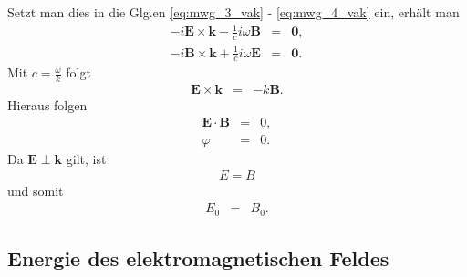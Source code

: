 \documentclass{book}
\begin{document}
%
Setzt man dies in die Glg.en \eqref{eq:mwg_3_vak} - \eqref{eq:mwg_4_vak} ein, erhält man
%
\begin{eqnarray}
- i\mathbf{E}\times\mathbf{k} - \frac{1}{c}i\omega\mathbf{B} & = & \mathbf{0}\label{eq:ed_deriv_1},\\
- i\mathbf{B}\times\mathbf{k} + \frac{1}{c}i\omega\mathbf{E} & = & \mathbf{0}\label{eq:ed_deriv_2}.
\end{eqnarray}
%
Mit $c = \frac{\omega}{k}$ folgt
%
\begin{eqnarray}
\mathbf{E}\times\mathbf{k} & = & -k\mathbf{B}.
\end{eqnarray}
%
Hieraus folgen
%
\begin{eqnarray}
\mathbf{E}\cdot\mathbf{B} & = & 0,\\
\varphi & = & 0.
\end{eqnarray}
%
Da $\mathbf{E}\perp\mathbf{k}$ gilt, ist
%
\begin{eqnarray}
E = B
\end{eqnarray}
%
und somit
%
\begin{eqnarray}
E_0 & = & B_0.
\end{eqnarray}
%
\subsection{Energie des elektromagnetischen Feldes}
\label{sec:energy_des_elektromagnetischen_feldes}
\end{document}
